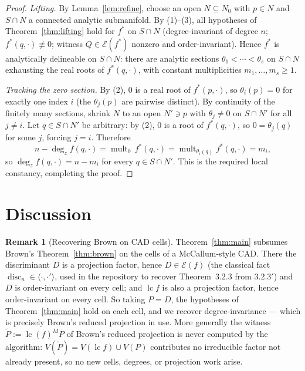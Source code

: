 \documentclass[11pt,a4paper]{article}
\theoremstyle{definition}
\newtheorem{remark}[theorem]{Remark}
\newcommand{\lc}{\operatorname{lc}}
\newcommand{\disc}{\operatorname{disc}}
\newcommand{\mult}{\operatorname{mult}}
\newcommand{\E}{\mathcal{E}}
\newcommand{\ideal}[1]{\langle #1\rangle}
\begin{document}
\begin{proof}
\emph{Lifting.} By Lemma~\ref{lem:refine}, choose an open $N \subseteq N_0$
with $p \in N$ and $S \cap N$ a connected analytic submanifold. By (1)--(3),
all hypotheses of Theorem~\ref{thm:lifting} hold for $f^*$ on $S \cap N$
(degree-invariant of degree $n$; $f^*(q,\cdot)\not\equiv0$; witness
$Q \in \E(f^*)$ nonzero and order-invariant). Hence $f^*$ is analytically
delineable on $S\cap N$: there are analytic sections
$\theta_1 < \cdots < \theta_s$ on $S \cap N$ exhausting the real roots of
$f^*(q,\cdot)$, with constant multiplicities $m_1,\dots,m_s \geq 1$.

\emph{Tracking the zero section.} By (2), $0$ is a real root of $f^*(p,\cdot)$,
so $\theta_i(p) = 0$ for exactly one index $i$ (the $\theta_j(p)$ are pairwise
distinct). By continuity of the finitely many sections, shrink $N$ to an open
$N' \ni p$ with $\theta_j \neq 0$ on $S \cap N'$ for all $j \neq i$. Let
$q \in S \cap N'$ be arbitrary: by (2), $0$ is a root of $f^*(q,\cdot)$, so
$0 = \theta_j(q)$ for some $j$, forcing $j = i$. Therefore
\[
  n - \deg_z f(q,\cdot) = \mult_0\, f^*(q,\cdot)
    = \mult_{\theta_i(q)} f^*(q,\cdot) = m_i ,
\]
so $\deg_z f(q,\cdot) = n - m_i$ for every $q \in S \cap N'$. This is the
required local constancy, completing the proof.
\end{proof}

\section{Discussion}\label{sec:discussion}

\begin{remark}[Recovering Brown on CAD cells]\label{rem:pipeline}
Theorem~\ref{thm:main} subsumes Brown's Theorem~\ref{thm:brown} on the cells of
a McCallum-style CAD. There the discriminant $D$ is a projection factor, hence
$D \in \E(f)$ (the classical fact $\disc_n \in \ideal{\cdot,\cdot'}$, used in
the repository to recover Theorem~3.2.3 from 3.2.3$'$) and $D$ is
order-invariant on every cell; and $\lc f$ is also a projection factor, hence
order-invariant on every cell. So taking $P = D$, the hypotheses of
Theorem~\ref{thm:main} hold on each cell, and we recover degree-invariance ---
which is precisely Brown's reduced projection in use. More generally the
witness $\widetilde P := \lc(f)^M P$ of Brown's reduced projection is never
computed by the algorithm: $V(\widetilde P) = V(\lc f) \cup V(P)$ contributes
no irreducible factor not already present, so no new cells, degrees, or
projection work arise.
\end{remark}
\end{document}
